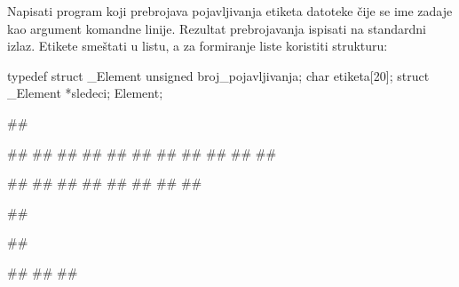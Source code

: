 \begin{Exercise}[label=603]
Napisati program koji prebrojava pojavljivanja etiketa  
datoteke čije se ime zadaje kao argument komandne linije. Rezultat prebrojavanja 
ispisati na standardni izlaz. Etikete smeštati u listu, a za formiranje liste koristiti strukturu:
\begin{ckod} 
 typedef struct _Element
 {
   unsigned broj_pojavljivanja;
   char etiketa[20];
   struct _Element *sledeci;
 } Element;
\end{ckod}
\begin{miditest}
\begin{test}{1}
##

##
##                       
##
##
##
##
##
##     
## 
## 
## 

#\naslovIzlaz#
##
##
##
##
##
##
##
\end{test}
\end{miditest}
\begin{miditest}
\begin{test}{2}
##

##

#\naslovIzlaz#
##
##
\end{test}
\end{miditest}
% 
% 
\end{Exercise}
\begin{Answer}[ref=603]
\end{Answer}

